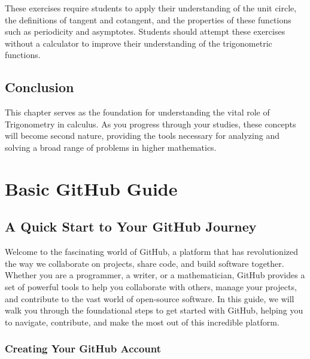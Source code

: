 \documentclass[a4paper,12pt]{book}
\begin{document}
These exercises require students to apply their understanding of the unit circle, the definitions of tangent and cotangent, and the properties of these functions such as periodicity and asymptotes. Students should attempt these exercises without a calculator to improve their understanding of the trigonometric functions.




\section*{Conclusion}
\label{sec:trig_conclusion}
This chapter serves as the foundation for understanding the vital role of Trigonometry in calculus. As you progress through your studies, these concepts will become second nature, providing the tools necessary for analyzing and solving a broad range of problems in higher mathematics.






\clearpage
{}
\appendix
\renewcommand{\thechapter}{\Roman{chapter}} %

\chapter{Basic GitHub Guide}
\section*{A Quick Start to Your GitHub Journey}

Welcome to the fascinating world of GitHub, a platform that has revolutionized the way we collaborate on projects, share code, and build software together. Whether you are a programmer, a writer, or a mathematician, GitHub provides a set of powerful tools to help you collaborate with others, manage your projects, and contribute to the vast world of open-source software. In this guide, we will walk you through the foundational steps to get started with GitHub, helping you to navigate, contribute, and make the most out of this incredible platform.

\subsection*{Creating Your GitHub Account}
\end{document}
